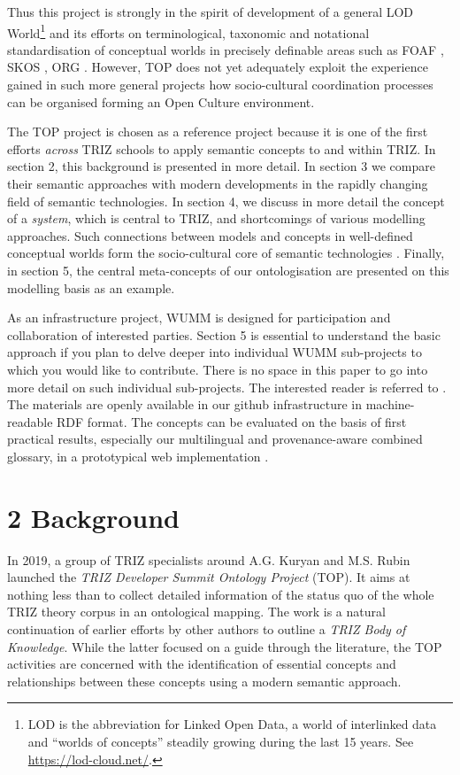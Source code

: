 \documentclass[12pt,a4paper]{article}
\begin{document}
Thus this project is strongly in the spirit of development of a general LOD
World\footnote{LOD is the abbreviation for Linked Open Data, a world of
  interlinked data and “worlds of concepts” steadily growing during the last
  15 years. See \url{https://lod-cloud.net/}.} and its efforts on
terminological, taxonomic and notational standardisation of conceptual worlds
in precisely definable areas such as FOAF \cite{7}, SKOS \cite{19,20}, ORG
\cite{17}. However, TOP does not yet adequately exploit the experience gained
in such more general projects how socio-cultural coordination processes can be
organised forming an Open Culture environment.

The TOP project is chosen as a reference project because it is one of the
first efforts \emph{across} TRIZ schools to apply semantic concepts to and
within TRIZ. In section 2, this background is presented in more detail. In
section 3 we compare their semantic approaches with modern developments in the
rapidly changing field of semantic technologies. In section 4, we discuss in
more detail the concept of a \emph{system}, which is central to TRIZ, and
shortcomings of various modelling approaches. Such connections between models
and concepts in well-defined conceptual worlds form the socio-cultural core of
semantic technologies \cite{9}. Finally, in section 5, the central
meta-concepts of our ontologisation are presented on this modelling basis as
an example.

As an infrastructure project, WUMM is designed for participation and
collaboration of interested parties. Section 5 is essential to understand the
basic approach if you plan to delve deeper into individual WUMM sub-projects
to which you would like to contribute. There is no space in this paper to go
into more detail on such individual sub-projects. The interested reader is
referred to \cite{10}.  The materials are openly available in our github
infrastructure \cite{25} in machine-readable RDF format. The concepts can be
evaluated on the basis of first practical results, especially our multilingual
and provenance-aware combined glossary, in a prototypical web implementation
\cite{27}.

\section*{2 Background}

In 2019, a group of TRIZ specialists around A.G. Kuryan and M.S. Rubin
launched the \emph{TRIZ Developer Summit Ontology Project} (TOP). It aims at
nothing less than to collect detailed information of the status quo of the
whole TRIZ theory corpus in an ontological mapping. The work is a natural
continuation of earlier efforts by other authors \cite{14,15} to outline a
\emph{TRIZ Body of Knowledge}. While the latter focused on a guide through the
literature, the TOP activities are concerned with the identification of
essential concepts and relationships between these concepts using a modern
semantic approach.
\end{document}

